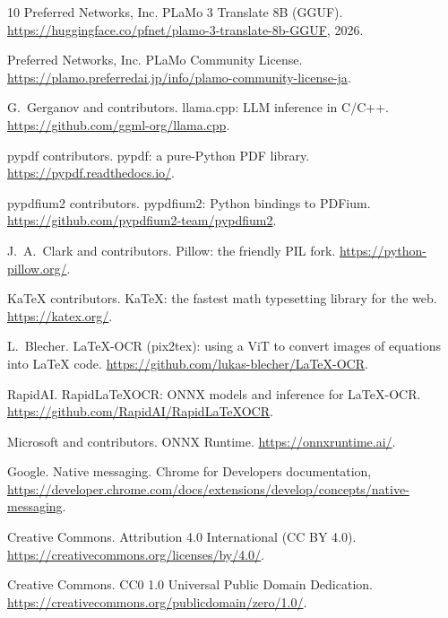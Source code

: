 \documentclass[11pt]{article}
\begin{document}
\begin{thebibliography}{10}
Preferred Networks, Inc.
\newblock PLaMo 3 Translate 8B (GGUF).
\newblock \url{https://huggingface.co/pfnet/plamo-3-translate-8b-GGUF}, 2026.

Preferred Networks, Inc.
\newblock PLaMo Community License.
\newblock \url{https://plamo.preferredai.jp/info/plamo-community-license-ja}.

G.~Gerganov and contributors.
\newblock llama.cpp: LLM inference in C/C++.
\newblock \url{https://github.com/ggml-org/llama.cpp}.

pypdf contributors.
\newblock pypdf: a pure-Python PDF library.
\newblock \url{https://pypdf.readthedocs.io/}.

pypdfium2 contributors.
\newblock pypdfium2: Python bindings to PDFium.
\newblock \url{https://github.com/pypdfium2-team/pypdfium2}.

J.~A.~Clark and contributors.
\newblock Pillow: the friendly PIL fork.
\newblock \url{https://python-pillow.org/}.

KaTeX contributors.
\newblock KaTeX: the fastest math typesetting library for the web.
\newblock \url{https://katex.org/}.

L.~Blecher.
\newblock LaTeX-OCR (pix2tex): using a ViT to convert images of equations into LaTeX code.
\newblock \url{https://github.com/lukas-blecher/LaTeX-OCR}.

RapidAI.
\newblock RapidLaTeXOCR: ONNX models and inference for LaTeX-OCR.
\newblock \url{https://github.com/RapidAI/RapidLaTeXOCR}.

Microsoft and contributors.
\newblock ONNX Runtime.
\newblock \url{https://onnxruntime.ai/}.

Google.
\newblock Native messaging.
\newblock Chrome for Developers documentation, \url{https://developer.chrome.com/docs/extensions/develop/concepts/native-messaging}.

Creative Commons.
\newblock Attribution 4.0 International (CC BY 4.0).
\newblock \url{https://creativecommons.org/licenses/by/4.0/}.

Creative Commons.
\newblock CC0 1.0 Universal Public Domain Dedication.
\newblock \url{https://creativecommons.org/publicdomain/zero/1.0/}.
\end{thebibliography}
\end{document}
